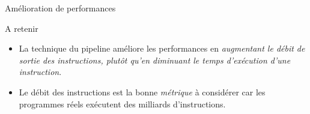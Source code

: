 %
\begin{Frame}{Amélioration de performances}


\begin{block}{A retenir}
       \begin{center}
 	\begin{itemize}
         \item La technique du pipeline améliore les performances en \emph{augmentant le débit de sortie des instructions, plutôt qu'en diminuant le temps d'exécution d'une instruction}.
	\item Le débit des instructions est la bonne \emph{métrique} à considérer car les programmes réels exécutent des milliards d'instructions.
        \end{itemize}
       \end{center}
      \end{block}   


\end{Frame}


